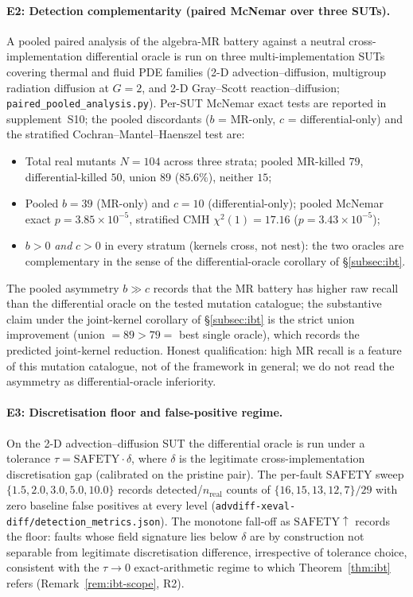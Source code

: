 \documentclass[acmsmall,screen,review]{acmart}
\begin{document}
\paragraph{E2: Detection complementarity (paired McNemar over three SUTs).}
A pooled paired analysis of the algebra-MR battery against a neutral cross-implementation differential oracle is run on three multi-implementation SUTs covering thermal and fluid PDE families (2-D advection--diffusion, multigroup radiation diffusion at $G = 2$, and 2-D Gray--Scott reaction--diffusion; \texttt{paired\_pooled\_analysis.py}). Per-SUT McNemar exact tests are reported in supplement~S10; the pooled discordants ($b$ = MR-only, $c$ = differential-only) and the stratified Cochran--Mantel--Haenszel test are:
\begin{itemize}[leftmargin=*,nosep]
  \item Total real mutants $N = 104$ across three strata; pooled MR-killed $79$, differential-killed $50$, union $89$ ($85.6\%$), neither $15$;
  \item Pooled $b = 39$ (MR-only) and $c = 10$ (differential-only); pooled McNemar exact $p = 3.85 \times 10^{-5}$, stratified CMH $\chi^{2}(1) = 17.16$ ($p = 3.43 \times 10^{-5}$);
  \item $b > 0$ \emph{and} $c > 0$ in every stratum (kernels cross, not nest): the two oracles are complementary in the sense of the differential-oracle corollary of \S\ref{subsec:ibt}.
\end{itemize}
The pooled asymmetry $b \gg c$ records that the MR battery has higher raw recall than the differential oracle on the tested mutation catalogue; the substantive claim under the joint-kernel corollary of \S\ref{subsec:ibt} is the strict union improvement (union $= 89 > 79 = $ best single oracle), which records the predicted joint-kernel reduction. Honest qualification: high MR recall is a feature of this mutation catalogue, not of the framework in general; we do not read the asymmetry as differential-oracle inferiority.

\paragraph{E3: Discretisation floor and false-positive regime.}
On the 2-D advection--diffusion SUT the differential oracle is run under a tolerance $\tau = \mathrm{SAFETY} \cdot \delta$, where $\delta$ is the legitimate cross-implementation discretisation gap (calibrated on the pristine pair). The per-fault $\mathrm{SAFETY}$ sweep $\{1.5, 2.0, 3.0, 5.0, 10.0\}$ records detected/$n_{\mathrm{real}}$ counts of $\{16,15,13,12,7\}/29$ with zero baseline false positives at every level (\texttt{advdiff-xeval-diff/detection\_metrics.json}). The monotone fall-off as $\mathrm{SAFETY} \uparrow$ records the floor: faults whose field signature lies below $\delta$ are by construction not separable from legitimate discretisation difference, irrespective of tolerance choice, consistent with the $\tau \to 0$ exact-arithmetic regime to which Theorem~\ref{thm:ibt} refers (Remark~\ref{rem:ibt-scope}, R2).
\end{document}
